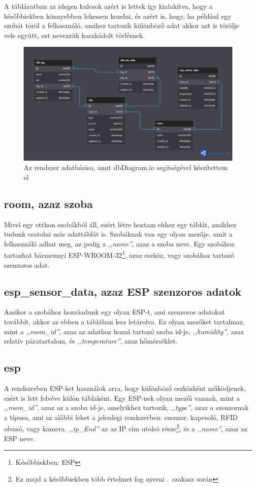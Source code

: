 \documentclass[
]{thesis-ekf}
\theoremstyle{definition}
\theoremstyle{remark}
\begin{document}
	A táblázatban az idegen kulcsok azért is lettek így kialakítva, hogy a későbbiekben könnyebben lehessen kezelni, és azért is, hogy, ha például egy szobát töröl a felhasználó, amihez tartozik különböző adat akkor azt is törölje vele együtt, ezt nevezzük kaszkádolt törlésnek.
	\begin{figure}[ht!]
		\centering
		\includegraphics[width=1\textwidth]{./src/database}
		\caption{Az rendszer adatbázisa, amit dbDiagram.io segítségével készítettem el}
		\label{database-fig}
	\end{figure}	

	\subsection*{room, azaz szoba}
	Mivel egy otthon szobákból áll, ezért létre hoztam ehhez egy táblát, amikhez tudunk csatolni más adattáblát is. Szobáknak van egy olyan mezője, amit a felhasználó adhat meg, az pedig a \emph{,,name''}, azaz a szoba neve. Egy szobához tartozhat bármennyi ESP-WROOM-32\footnote{Későbbiekben: ESP}, azaz eszköz, vagy szobához tartozó szenzoros adat.
	
	\subsection*{esp\_sensor\_data, azaz ESP szenzoros adatok}
	Amikor a szobához hozzáadunk egy olyan ESP-t, ami szenzoros adatokat továbbít, akkor az ebben a táblában lesz letárolva. Ez olyan mezőket tartalmaz, mint a \emph{,,room\_id''}, azaz az adathoz hozzá tartozó szoba id-je, \emph{,,humidity''}, azaz relatív páratartalom, és \emph{,,temperature''}, azaz hőmérséklet.
	
	\subsection*{esp}
	A rendszerben ESP-ket használok arra, hogy különböző eszközként működjenek, ezért is lett felvéve külön táblaként. Egy ESP-nek olyan mezői vannak, mint a \emph{,,room\_id''}, azaz az a szoba id-je, amelyikhez tartozik, \emph{,,type''}, azaz a szenzornak a típusa, ami az alábbi lehet a jelenlegi rendszerben: szenzor, kapcsoló, RFID olvasó, vagy kamera.  \emph{,,ip\_End''} az az IP cím utolsó része\footnote{Ez majd a későbbiekben több értelmet fog nyerni .~szakasz során}, és a \emph{,,name''}, azaz az ESP neve.
	
\end{document}
